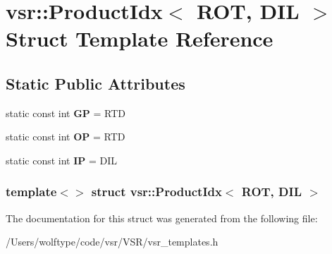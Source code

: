 \hypertarget{structvsr_1_1_product_idx_3_01_r_o_t_00_01_d_i_l_01_4}{\section{vsr\-:\-:Product\-Idx$<$ R\-O\-T, D\-I\-L $>$ Struct Template Reference}
\label{structvsr_1_1_product_idx_3_01_r_o_t_00_01_d_i_l_01_4}
}
\subsection*{Static Public Attributes}
\begin{DoxyCompactItemize}
\item 
\hypertarget{structvsr_1_1_product_idx_3_01_r_o_t_00_01_d_i_l_01_4_a6286434d454a3063a1e9117aea7aa562}{static const int {\bfseries G\-P} = R\-T\-D}\label{structvsr_1_1_product_idx_3_01_r_o_t_00_01_d_i_l_01_4_a6286434d454a3063a1e9117aea7aa562}

\item 
\hypertarget{structvsr_1_1_product_idx_3_01_r_o_t_00_01_d_i_l_01_4_ab20c7a56dccc817a73ec5aba67e90428}{static const int {\bfseries O\-P} = R\-T\-D}\label{structvsr_1_1_product_idx_3_01_r_o_t_00_01_d_i_l_01_4_ab20c7a56dccc817a73ec5aba67e90428}

\item 
\hypertarget{structvsr_1_1_product_idx_3_01_r_o_t_00_01_d_i_l_01_4_a1730dca47c5bf0b3b2fdb7462ec21b03}{static const int {\bfseries I\-P} = D\-I\-L}\label{structvsr_1_1_product_idx_3_01_r_o_t_00_01_d_i_l_01_4_a1730dca47c5bf0b3b2fdb7462ec21b03}

\end{DoxyCompactItemize}
\subsubsection*{template$<$$>$ struct vsr\-::\-Product\-Idx$<$ R\-O\-T, D\-I\-L $>$}



The documentation for this struct was generated from the following file\-:\begin{DoxyCompactItemize}
\item 
/\-Users/wolftype/code/vsr/\-V\-S\-R/vsr\-\_\-templates.\-h\end{DoxyCompactItemize}
